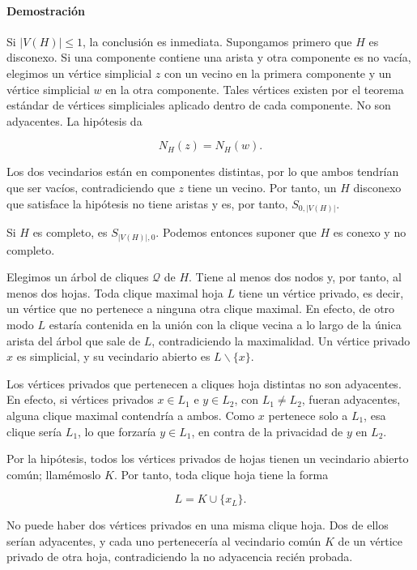 \documentclass[spanish,11pt,a4paper]{article}
\begin{document}
\paragraph{Demostración}\label{demostraciuxf3n-5}

Si \(|V(H)|\le1\), la conclusión es inmediata. Supongamos primero que
\(H\) es disconexo. Si una componente contiene una arista y otra
componente es no vacía, elegimos un vértice simplicial \(z\) con un
vecino en la primera componente y un vértice simplicial \(w\) en la otra
componente. Tales vértices existen por el teorema estándar de vértices
simpliciales aplicado dentro de cada componente. No son adyacentes. La
hipótesis da

\[
N_H(z)=N_H(w).
\]

Los dos vecindarios están en componentes distintas, por lo que ambos
tendrían que ser vacíos, contradiciendo que \(z\) tiene un vecino. Por
tanto, un \(H\) disconexo que satisface la hipótesis no tiene aristas y
es, por tanto, \(S_{0,|V(H)|}\).

Si \(H\) es completo, es \(S_{|V(H)|,0}\). Podemos entonces suponer que
\(H\) es conexo y no completo.

Elegimos un árbol de cliques \(\mathcal Q\) de \(H\). Tiene al menos dos
nodos y, por tanto, al menos dos hojas. Toda clique maximal hoja \(L\)
tiene un vértice privado, es decir, un vértice que no pertenece a
ninguna otra clique maximal. En efecto, de otro modo \(L\) estaría
contenida en la unión con la clique vecina a lo largo de la única arista
del árbol que sale de \(L\), contradiciendo la maximalidad. Un vértice
privado \(x\) es simplicial, y su vecindario abierto es
\(L\backslash\{x\}\).

Los vértices privados que pertenecen a cliques hoja distintas no son
adyacentes. En efecto, si vértices privados \(x\in L_1\) e \(y\in L_2\),
con \(L_1\ne L_2\), fueran adyacentes, alguna clique maximal contendría
a ambos. Como \(x\) pertenece solo a \(L_1\), esa clique sería \(L_1\),
lo que forzaría \(y\in L_1\), en contra de la privacidad de \(y\) en
\(L_2\).

Por la hipótesis, todos los vértices privados de hojas tienen un
vecindario abierto común; llamémoslo \(K\). Por tanto, toda clique hoja
tiene la forma

\[
L=K\cup\{x_L\}.
\]

No puede haber dos vértices privados en una misma clique hoja. Dos de
ellos serían adyacentes, y cada uno pertenecería al vecindario común
\(K\) de un vértice privado de otra hoja, contradiciendo la no
adyacencia recién probada.
\end{document}
